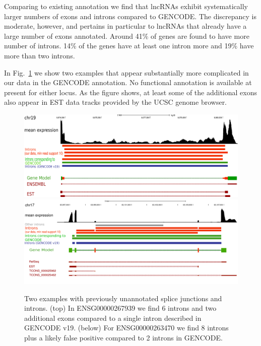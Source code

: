 \documentclass[ncrna,article,submit,moreauthors,pdftex,10pt,a4paper]{mdpi}
\begin{document}
Comparing to existing annotation we find that lncRNAs exhibit
systematically larger numbers of exons and introns compared to GENCODE. The
discrepancy is moderate, however, and pertains in particular to lncRNAs
that already have a large number of exons annotated.  Around 41\% of genes
are found to have more number of introns. 14\% of the genes have at least
one intron more and 19\% have more than two introns.

In Fig.~\ref{fig:examples} we show two examples that appear substantially
more complicated in our data in the GENCODE annotation. No functional
annotation is available at present for either locus. As the figure shows,
at least some of the additional exons also appear in EST data tracks
provided by the UCSC genome browser.

\begin{figure}[t]
\begin{center}
\includegraphics[width=\textwidth]{267939.pdf}\\[1em]
\includegraphics[width=\textwidth]{example.pdf}
\end{center}
\caption{Two examples with previously unannotated splice junctions and
  introns.  (top) In ENSG00000267939 we find 6 introns and two additional
  exons compared to a single intron described in GENCODE v19.  (below) For
  ENSG00000263470 we find 8 introns plus a likely false positive compared
  to 2 introns in GENCODE.}
\label{fig:examples} 
\end{figure}
\end{document}
